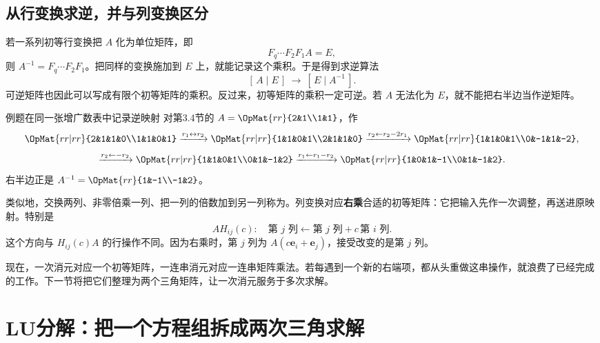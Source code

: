 \documentclass[a4paper,12pt,twoside,openany,fontset=none]{ctexbook}
\newcounter{example}[chapter]
\newenvironment{example}[1][]{\begin{exBox}{例题}{#1}}{\end{exBox}}
\numberwithin{equation}{chapter}
\begin{document}
\subsection*{从行变换求逆，并与列变换区分}

若一系列初等行变换把 $A$ 化为单位矩阵，即
\[
 F_q\cdots F_2F_1A=E,
\]
则 $A^{-1}=F_q\cdots F_2F_1$。把同样的变换施加到 $E$ 上，就能记录这个乘积。于是得到求逆算法
\[
 \boxed{[\,A\mid E\,]\ \longrightarrow\ [\,E\mid A^{-1}\,].}
\]
可逆矩阵也因此可以写成有限个初等矩阵的乘积。反过来，初等矩阵的乘积一定可逆。若 $A$ 无法化为 $E$，就不能把右半边当作逆矩阵。

\begin{example}[在同一张增广数表中记录逆映射]
对第3.4节的 $A=\OpMat{rr}{2&1\\1&1}$，作
\[
 \OpMat{rr|rr}{2&1&1&0\\1&1&0&1}
 \xrightarrow{r_1\leftrightarrow r_2}
 \OpMat{rr|rr}{1&1&0&1\\2&1&1&0}
 \xrightarrow{r_2\leftarrow r_2-2r_1}
 \OpMat{rr|rr}{1&1&0&1\\0&-1&1&-2},
\]
\[
 \xrightarrow{r_2\leftarrow-r_2}
 \OpMat{rr|rr}{1&1&0&1\\0&1&-1&2}
 \xrightarrow{r_1\leftarrow r_1-r_2}
 \OpMat{rr|rr}{1&0&1&-1\\0&1&-1&2}.
\]
右半边正是 $A^{-1}=\OpMat{rr}{1&-1\\-1&2}$。
\end{example}

类似地，交换两列、非零倍乘一列、把一列的倍数加到另一列称为。列变换对应\textbf{右乘}合适的初等矩阵：它把输入先作一次调整，再送进原映射。特别是
\[
 AH_{ij}(c):\quad \text{第 $j$ 列}\leftarrow\text{第 $j$ 列}+c\,\text{第 $i$ 列}.
\]
这个方向与 $H_{ij}(c)A$ 的行操作不同。因为右乘时，第 $j$ 列为 $A(c\boldsymbol e_i+\boldsymbol e_j)$，接受改变的是第 $j$ 列。


现在，一次消元对应一个初等矩阵，一连串消元对应一连串矩阵乘法。若每遇到一个新的右端项，都从头重做这串操作，就浪费了已经完成的工作。下一节将把它们整理为两个三角矩阵，让一次消元服务于多次求解。


\section{LU分解：把一个方程组拆成两次三角求解}
\label{sec:three-lu}
\end{document}
